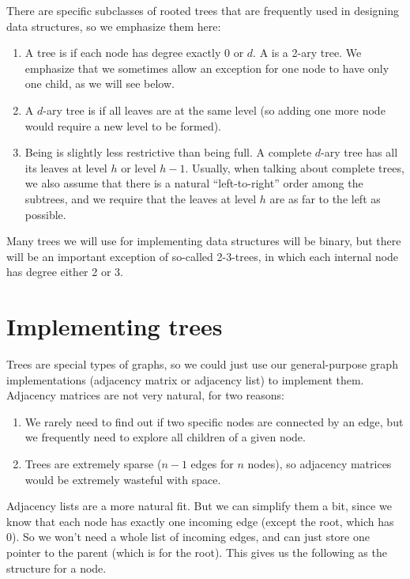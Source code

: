 There are specific subclasses of rooted trees that are frequently used
in designing data structures, so we emphasize them here:
\begin{enumerate}
\item A tree is  if each node has degree exactly 0 or $d$.
A  is a 2-ary tree.
We emphasize that we sometimes allow an exception for one node to have
only one child, as we will see below.
\item A $d$-ary tree is  if all leaves are at the same
  level (so adding one more node would require a new level to be formed).
\item Being  is slightly less restrictive than being full.
 A complete $d$-ary tree has all its leaves at level $h$ or level
 $h-1$. 
 Usually, when talking about complete trees, we also assume that there
 is a natural ``left-to-right'' order among the subtrees, and we
 require that the leaves at level $h$ are as far to the left as possible.
\end{enumerate}

Many trees we will use for implementing data structures will be
binary, but there will be an important exception of so-called
2-3-trees, in which each internal node has degree either 2 or 3.

\section{Implementing trees}
Trees are special types of graphs, so we could just use our
general-purpose graph implementations (adjacency matrix or adjacency
list) to implement them.
Adjacency matrices are not very natural, for two reasons:
\begin{enumerate}
\item We rarely need to find out if two specific nodes are connected
  by an edge, but we frequently need to explore all children of a
  given node.
\item Trees are extremely sparse ($n-1$ edges for $n$ nodes), so
  adjacency matrices would be extremely wasteful with space.
\end{enumerate}

Adjacency lists are a more natural fit. But we can simplify them a
bit, since we know that each node has exactly one incoming edge
(except the root, which has 0). So we won't need a whole list of
incoming edges, and can just store one pointer to the parent (which is
 for the root).
This gives us the following as the structure for a node.

